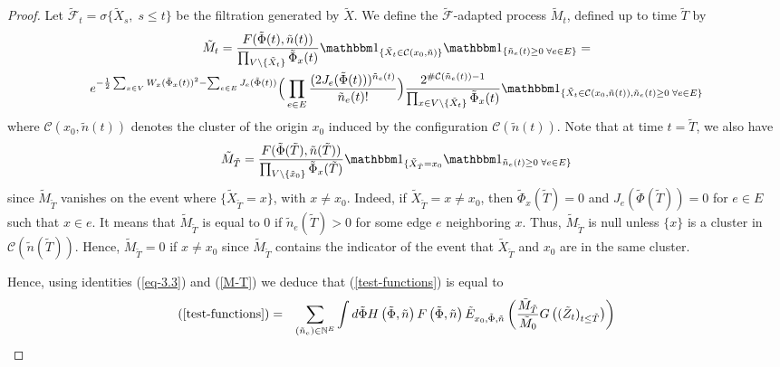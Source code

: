 \documentclass[11pt,a4paper]{amsart}
\numberwithin{equation}{section}
\def\ccc{{\mathcal C}}
\def\R{{\mathbb R}}
\def\N{{\mathbb N}}
\def\demi{{1\over 2}}
\def\fff{{\mathcal F}}
\def\indic{{{\mathbbm 1}}}
\begin{document}
\begin{proof}
Let $\tilde\fff_t=\sigma\{\tilde X_s, \; s\le t\}$ be the filtration generated by $\tilde X$. We define the $\tilde \fff$-adapted process
$\tilde M_t$, defined up to time $\tilde T$ by
\begin{multline}
\label{Mart}
\tilde M_t
= {F(\tilde \Phi(t), \tilde n(t))\over \prod_{V\setminus\{\tilde X_t\}} \tilde\Phi_x(t) }\indic_{\{\tilde X_t\in \ccc(x_0,\tilde n)\}}\indic_{\{\tilde n_e(t)\ge 0\; \forall e\in E\}}=
\\
e^{-\demi \sum_{x\in V} W_x(\tilde \Phi_x(t))^2-\sum_{e\in E} J_e(\tilde\Phi(t)) }
\Big(\prod_{e\in E} {(2J_e(\tilde \Phi(t)))^{\tilde n_e(t)}\over \tilde n_e(t) !}\Big)
{2^{\#\ccc(\tilde n_e(t))-1}
\over \prod_{x\in V\setminus\{\tilde X_t\}} \tilde\Phi_x(t) }\indic_{\{\tilde X_t\in \ccc(x_0,\tilde n(t)),\tilde n_e(t)\ge 0\; \forall e\in E\}}
\end{multline}
where $\ccc(x_0,\tilde n(t))$ denotes the cluster of the origin $x_0$ induced by the configuration $\ccc(\tilde n(t))$.
Note that at time $t=\tilde T$, we also have
\begin{eqnarray}\label{M-T}
\tilde M_{\tilde T}= {F(\tilde \Phi(\tilde T), \tilde n(\tilde T))\over \prod_{V\setminus\{\tilde x_0\}} \tilde\Phi_x(\tilde T) }\indic_{\{\tilde X_{\tilde T}=x_0}\indic_{\tilde n_e(t)\ge 0\; \forall e\in E\}} 
\end{eqnarray}
since $\tilde M_{\tilde T}$ vanishes on the event where $\{\tilde X_{\tilde T}=x\}$, with $x\neq x_0$. Indeed, if $\tilde X_{\tilde T}=x\neq x_0$, then
$\tilde\Phi_x(\tilde T)=0$ and $J_e(\tilde\Phi(\tilde T))=0$ for $e\in E$ such that $x\in e$. It means that $\tilde M_{\tilde T}$ is equal to
0 if $\tilde n_{e}(\tilde T)>0$ for some edge $e$ neighboring $x$. Thus, $\tilde M_{\tilde T}$ is null unless $\{x\}$ is a cluster in $\ccc(\tilde n(\tilde T))$.
Hence, $\tilde M_{\tilde T}=0$ if $x\neq x_0$ since $\tilde M_{\tilde T}$ contains the indicator of the event that $\tilde X_{\tilde T}$ and $x_0$ are in the same cluster. 

Hence, using identities (\ref{eq-3.3}) and (\ref{M-T})
we deduce that (\ref{test-functions}) is equal to 
\begin{eqnarray}
\label{equ-M}
(\ref{test-functions})&=&
\sum_{(\tilde n_e)\in \N^E} \int d\tilde\Phi
H\left(\tilde \Phi,\tilde n\right) F\left(\tilde \Phi,\tilde n\right)
\tilde E_{x_0, \tilde \Phi, \tilde n}\left(
{\tilde M_{\tilde T}\over \tilde M_0} 
 G\left((\tilde Z_{t})_{t\le\tilde T}\right)
\right)
\end{eqnarray}


\end{proof}
\end{document}
